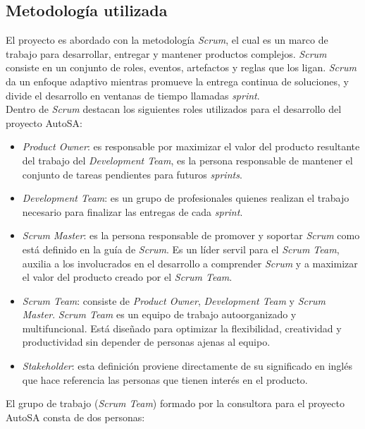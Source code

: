 \subsection{Metodología utilizada}
El proyecto es abordado con la metodología \textit{Scrum}, el cual es un marco de trabajo para desarrollar, entregar y mantener productos complejos. \textit{Scrum} consiste en un conjunto de roles, eventos, artefactos y reglas que los ligan. \textit{Scrum} da un enfoque adaptivo mientras promueve la entrega continua de soluciones, y divide el desarrollo en ventanas de tiempo llamadas \textit{sprint}\cite{scrum}.\\
Dentro de \textit{Scrum} destacan los siguientes roles utilizados para el desarrollo del proyecto AutoSA\cite{scrum}:
\begin{itemize}
	\item \textit{Product Owner}: es responsable por maximizar el valor del producto resultante del trabajo del \textit{Development Team}, es la persona responsable de mantener el conjunto de tareas pendientes para futuros \textit{sprints}.
	\item \textit{Development Team}: es un grupo de profesionales quienes realizan el trabajo necesario para finalizar las entregas de cada \textit{sprint}.
	\item \textit{Scrum Master}: es la persona responsable de promover y soportar \textit{Scrum} como está definido en la guía de \textit{Scrum}. Es un líder servil para el \textit{Scrum Team}, auxilia a los involucrados en el desarrollo a comprender \textit{Scrum} y a maximizar el valor del producto creado por el \textit{Scrum Team}.
	\item \textit{Scrum Team}: consiste de \textit{Product Owner}, \textit{Development Team} y \textit{Scrum Master}. \textit{Scrum Team} es un equipo de trabajo autoorganizado y multifuncional. Está diseñado para optimizar la flexibilidad, creatividad y productividad sin depender de personas ajenas al equipo.
	\item \textit{Stakeholder}: esta definición proviene directamente de su significado en inglés que hace referencia las personas que tienen interés en el producto.
\end{itemize}
El grupo de trabajo (\textit{Scrum Team}) formado por la consultora para el proyecto AutoSA consta de dos personas:

